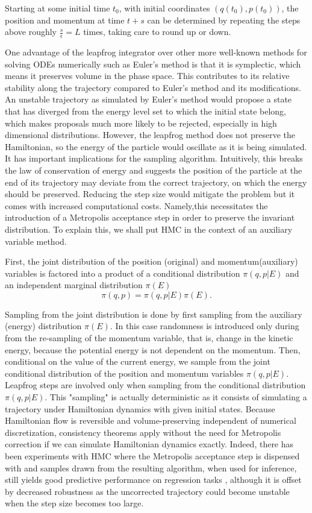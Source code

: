 \documentclass[12pt]{report}
\begin{document}
Starting at some initial time $t_0$, with initial coordinates $(q(t_0),p(t_0))$, the position and momentum at time $t+s$ can be determined by repeating the steps above roughly $\frac{s}{\epsilon} = L$ times, taking care to round up or down. 

One advantage of the leapfrog integrator over other more well-known methods for
solving ODEs numerically such as Euler's method is that it is symplectic, which
means it preserves volume in the phase space. This
contributes to its relative stability along the trajectory compared to Euler's
method and its modifications. An unstable trajectory as simulated by Euler's
method would propose a state that has diverged from the energy level set to
which the initial state belong, which makes proposals much more likely to be
rejected, especially in high dimensional distributions.  However,
the leapfrog method does not preserve the Hamiltonian, so the energy of the particle would
oscillate as it is being simulated. It has important implications for the
sampling algorithm. Intuitively, this breaks the law of conservation of energy
and suggests the position of the particle at the end of its trajectory may
deviate from the correct trajectory, on which the energy should be preserved.
Reducing the step size would mitigate the problem but it comes with increased
computational costs. Namely,this necessitates the introduction of a Metropolis
acceptance step in order to preserve the invariant distribution. To explain
this, we shall put HMC in the context of an auxiliary variable method. 

First, the joint distribution of the position (original) and momentum(auxiliary)
variables is factored into a product of a conditional distribution $\pi(q,p|E)$ and an
independent marginal distribution $\pi(E)$
\[ \pi(q,p) = \pi(q,p|E)\pi(E) .\]

Sampling from the joint distribution is done by first sampling from the
auxiliary (energy) distribution $\pi(E)$. In this case randomness is introduced only during from the
re-sampling of the momentum variable, that is, change in the kinetic energy,
because the potential energy is not dependent on the momentum. Then, conditional on the value of the
current energy, we sample from the joint
conditional distribution of the position and momentum variables $\pi(q,p|E)$. Leapfrog steps
are involved only when sampling from the conditional distribution $\pi(q,p|E)$.
This "sampling" is actually deterministic as it consists of simulating a
trajectory under Hamiltonian dynamics with given initial states. Because
Hamiltonian flow is reversible and volume-preserving independent of numerical
discretization, consistency theorems apply without the need for Metropolis
correction if we can simulate Hamiltonian dynamics exactly. Indeed, there has
been experiments with HMC where the Metropolis acceptance step is dispensed with
and samples drawn from the resulting algorithm, when used for inference, still yields good predictive
performance on regression tasks \cite{neal1993bayesian}, although it is offset
by
decreased robustness as the uncorrected trajectory could become unstable when
the step size becomes too large.
 
\end{document}
